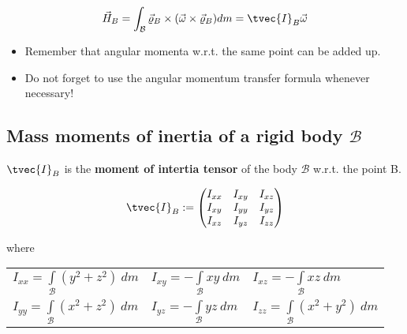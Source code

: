 \documentclass[10pt,a4paper]{scrartcl}
\begin{document}
\begin{multicols*}{2}
\begin{equation*}
\vec{H}_B=\int_\mathcal{B}\vec{\varrho}_B\times(\vec{\omega}\times\vec{\varrho}_B)dm=\tvec{I}_B\vec{\omega}
\end{equation*}


\begin{itemize}
\item Remember that angular momenta w.r.t. the same point can be added up.
\item Do not forget to use the angular momentum transfer formula whenever necessary!
\end{itemize}

\subsection{Mass moments of inertia of a rigid body $\mathcal{B}$}

$\tvec{I}_B$ is the \textbf{moment of intertia tensor} of the body $\mathcal{B}$ w.r.t. the point B.

\begin{equation*}
\tvec{I}_B:=\begin{pmatrix}I_{xx}&I_{xy}&I_{xz}\\I_{xy}&I_{yy}&I_{yz}\\I_{xz}&I_{yz}&I_{zz}\end{pmatrix}
\end{equation*}

where

\begin{center}
\large
\renewcommand{\arraystretch}{2}
\begin{tabular}{l@{$\qquad$}l@{$\qquad$}l}
$I_{xx}=\int\limits_\mathcal{B}(y^2+z^2)\ dm$&
$I_{xy}=-\int\limits_\mathcal{B}xy\ dm$&
$I_{xz}=-\int\limits_\mathcal{B}xz\ dm$\\
$I_{yy}=\int\limits_\mathcal{B}(x^2+z^2)\ dm$&
$I_{yz}=-\int\limits_\mathcal{B}yz\ dm$&
$I_{zz}=\int\limits_\mathcal{B}(x^2+y^2)\ dm$
\end{tabular}
\end{center}


\end{multicols*}
\end{document}

